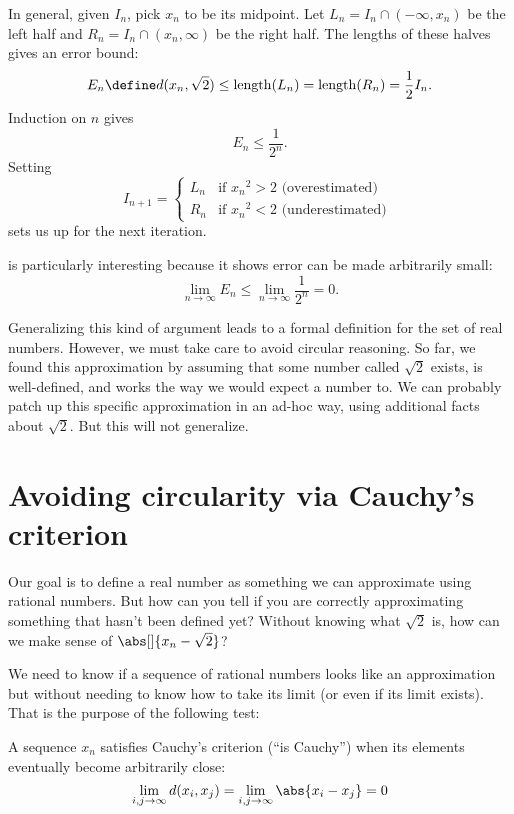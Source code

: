 \documentclass{scrartcl}
\newcommand{\dist}{d}
\newcommand{\length}{\mathrm{length}}
\begin{document}
\begin{example}
  In general, given \(I_{n}\), pick \(x_{n}\) to be its midpoint. Let \(L_{n}=I_{n} \cap (-\infty, x_{n})\) be the left half and \(R_{n}=I_{n}\cap (x_{n},\infty)\) be the right half. The lengths of these halves gives an error bound:
  \[
    E_{n} \define \dist(x_{n},\sqrt 2) \leq \length(L_{n}) = \length(R_{n}) = \frac12 I_{n}.
  \]
  Induction on $n$ gives
  \begin{equation}
    E_{n} \leq \frac{1}{2^{n}}.\label{eq:binary search error bound}
  \end{equation}
  Setting
  \[
    I_{n+1} =
    \begin{cases}
      L_{n}& \textrm{if } {x_{n}}^{2} > 2 \textrm{ (overestimated)}\\
      R_{n}& \textrm{if } {x_{n}}^{2} < 2 \textrm{ (underestimated) }
    \end{cases}
  \]
  sets us up for the next iteration.

   is particularly interesting because it shows error can be made arbitrarily small:
  \[
    \lim_{n\to\infty} E_{n} \leq \lim_{n\to\infty}\frac{1}{2^{n}} =0.
  \]
\end{example}

Generalizing this kind of argument leads to a formal definition for the set of real numbers. However, we must take care to avoid circular reasoning. So far, we found this approximation by assuming that some number called \(\sqrt 2\) exists, is well-defined, and works the way we would expect a number to. We can probably patch up this specific approximation in an ad-hoc way, using additional facts about \(\sqrt 2\). But this will not generalize.

\section{Avoiding circularity via Cauchy's criterion}
Our goal is to define a real number as something we can approximate using rational numbers. But how can you tell if you are correctly approximating something that hasn't been defined yet?
Without knowing what \(\sqrt 2\) is, how can we make sense of \(\abs[]{x_{n}-\sqrt 2}\)?

We need to know if a sequence of rational numbers looks like an approximation but without needing to know how to take its limit (or even if its limit exists). That is the purpose of the following test:
\begin{defn}\label{Cauchy's criterion}
  A sequence \(x_{n}\) satisfies Cauchy's criterion (``is Cauchy'') when its elements eventually become arbitrarily close:
  \[
    \lim_{i,j\to\infty} d(x_{i},x_{j})=\lim_{i,j\to \infty} \abs{x_{i}-x_{j}} =0
  \]
\end{defn}
\end{document}
